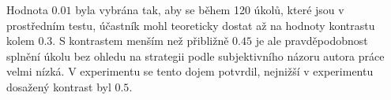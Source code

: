 Hodnota $0.01$ byla vybrána tak, aby se během 120 úkolů, které jsou v
prostředním testu, účastník mohl teoreticky dostat až na hodnoty kontrastu
kolem $0.3$. S kontrastem menším než přibližně $0.45$ je ale pravděpodobnost
splnění úkolu bez ohledu na strategii podle subjektivního názoru autora práce
velmi nízká. V experimentu se tento dojem potvrdil, nejnižší v experimentu
dosažený kontrast byl $0.5$.



